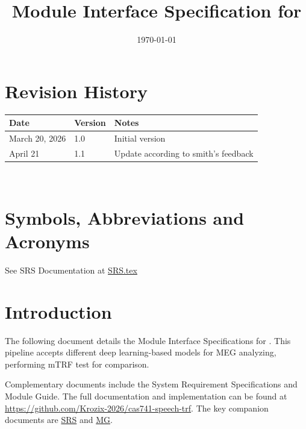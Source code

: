 \documentclass[12pt, titlepage]{article}
\begin{document}
\title{Module Interface Specification for \progname{}}

\author{\authname}

\date{\today}

\maketitle


\section{Revision History}

\begin{tabularx}{\textwidth}{p{3cm}p{2cm}X}
\toprule {\bf Date} & {\bf Version} & {\bf Notes}\\
\midrule
March 20, 2026 & 1.0 & Initial version\\
April 21 & 1.1 & Update according to smith's feedback\\
\bottomrule
\end{tabularx}

~\newpage

\section{Symbols, Abbreviations and Acronyms}

See SRS Documentation at \href{https://github.com/Krozix-2026/cas741-speech-trf/blob/main/docs/SRS/SRS.tex}{SRS.tex}




\newpage

\tableofcontents

\newpage


\section{Introduction}

The following document details the Module Interface Specifications for
\progname{}. This pipeline accepts different deep learning-based models for MEG analyzing, performing mTRF test for comparison.


Complementary documents include the System Requirement Specifications
and Module Guide.  The full documentation and implementation can be
found at \url{https://github.com/Krozix-2026/cas741-speech-trf}.  
The key companion documents are \href{https://github.com/Krozix-2026/cas741-speech-trf/blob/main/docs/SRS/SRS.tex}{SRS}
and
\href{https://github.com/Krozix-2026/cas741-speech-trf/blob/main/docs/Design/SoftArchitecture/MG.tex}{MG}.
\end{document}
